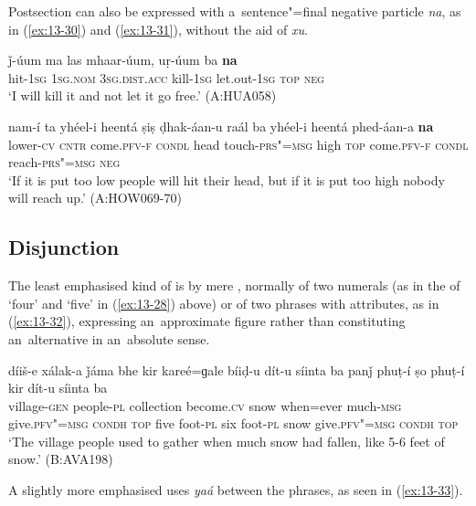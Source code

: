  Postsection can also be expressed with a~sentence"=final negative particle \textit{na}, as in (\ref{ex:13-30}) and (\ref{ex:13-31}), without the aid of \textit{xu}. 

\ea
\label{ex:13-30}
\gll ǰ-úum ma las mhaar-úum, uṛ-úum ba \textbf{na}\\
hit-\textsc{1sg} \textsc{1sg.nom} \textsc{3sg.dist.acc} kill-\textsc{1sg} let.out-\textsc{1sg}
\textsc{top} \textsc{neg} \\
\glt `I will kill it and not let it go free.' (A:HUA058)

\ex
\label{ex:13-31}
\gll nam-í ta yhéel-i heentá ṣiṣ ḍhak-áan-u raál ba yhéel-i heentá phed-áan-a \textbf{na} \\
lower-\textsc{cv} \textsc{cntr} come.\textsc{pfv-f} \textsc{condl} head touch-\textsc{prs"=msg}  high \textsc{top} come.\textsc{pfv-f} \textsc{condl} reach-\textsc{prs"=msg} \textsc{neg} \\
\glt `If it is put too low people will hit their head, but if it is put too high nobody will reach up.' (A:HOW069-70)
\z

\subsection{Disjunction}
\label{subsec:13-2-3}

 The least emphasised kind of  is by mere , normally of two numerals (as in the  of `four' and `five' in (\ref{ex:13-28}) above) or of two  phrases with  attributes, as in (\ref{ex:13-32}), expressing an~approximate figure rather than constituting an~alternative in an~absolute sense.

\begin{exe}
\ex
\label{ex:13-32}
\gll díiš-e xálak-a ǰáma bhe kir kareé=ɡale bíiḍ-u dít-u síinta ba {\ob}panǰ phuṭ-í ṣo phuṭ-í{\cb} kir dít-u síinta ba\\
village-\textsc{gen} people-\textsc{pl} collection become.\textsc{cv} snow  when=ever much-\textsc{msg} give.\textsc{pfv"=msg} \textsc{condh} \textsc{top} five  foot-\textsc{pl} six foot-\textsc{pl} snow give.\textsc{pfv"=msg} \textsc{condh} \textsc{top} \\
\glt `The village people used to gather when much snow had fallen, like 5-6 feet of snow.' (B:AVA198) 
\end{exe}

 A slightly more emphasised  uses \textit{yaá} between the phrases, as seen in (\ref{ex:13-33}).

